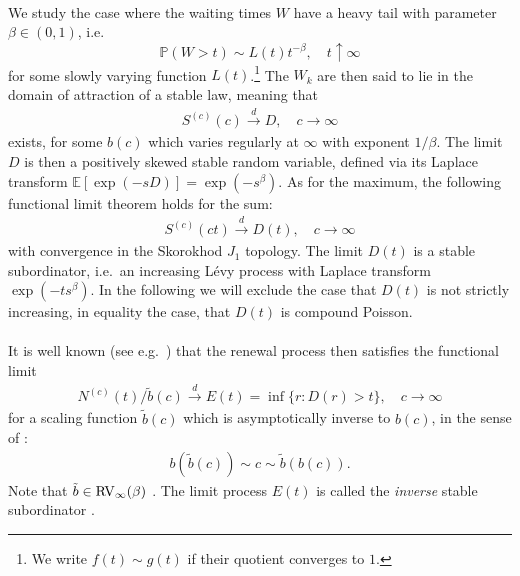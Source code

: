 \documentclass[12pt, a4paper]{article}
\newcommand{\PP}{\mathbb{P}}
\newcommand{\E}{\mathbb{E}}
\newcommand{\1}{\mathbf 1}
\newcommand{\cd}{\overset{d}{\longrightarrow}}
\begin{document}
\paragraph{}
We study the case where the waiting times $W$ have a heavy tail with
parameter $\beta \in (0,1)$, i.e.\ 
$$
\PP(W > t) \sim L(t) t^{-\beta}, \quad t \uparrow \infty
$$ 
for some slowly varying function $L(t)$.\footnote{
We write $f(t) \sim g(t)$ if their quotient converges to $1$.
}
The $W_k$ are then said to lie in the 
domain of attraction of a stable law, meaning that 
\begin{align}\label{eq:sclt}
S^{(c)}(c) \overset{d}{\longrightarrow} D, 
\quad c \to \infty
\end{align}
exists, for some $b(c)$ which varies regularly at $\infty$ with exponent 
$1/\beta$. 
The limit $D$ is then a positively skewed stable random variable, defined via
its Laplace transform $\E[\exp(-sD)] = \exp(-s^\beta)$.
As for the maximum, the following functional limit theorem holds for the sum:
\begin{align}
S^{(c)}(ct) \overset{d}{\longrightarrow} D(t), 
\quad c \to \infty
\end{align}
with convergence in the Skorokhod $J_1$ topology.
The limit $D(t)$ is a stable subordinator, i.e.\ an increasing
L\'evy process with Laplace transform $\exp(-t s^\beta)$. In the following we will exclude the case that $D(t)$ is not strictly increasing, in equality the case, that $D(t)$ is compound Poisson. 

\paragraph{}
It is well known (see e.g.\ \cite{limitCTRW}) that the renewal
process then satisfies the functional limit
\begin{align}
N^{(c)}(t)/\tilde b(c) \cd E(t) = \inf\{r: D(r) > t\}, 
\quad c \to \infty
\end{align}
for a scaling function $\tilde b(c)$ which is asymptotically inverse to $b(c)$, in the sense of \cite[p.20]{seneta}: 
\begin{align}\label{eq:tildeb}
b(\tilde b(c)) \sim c \sim \tilde b(b(c)).
\end{align}
Note that $\tilde b \in {\rm RV}_\infty(\beta)$ 
\cite{limitCTRW}.
The limit process $E(t)$ is called the \emph{inverse} stable
subordinator \cite{invSubord}.
\end{document}
